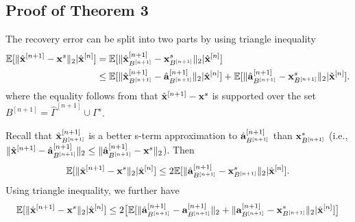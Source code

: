 \documentclass[article]{imsart}
\begin{document}



\subsection{Proof of Theorem 3}
The recovery error can be split into two parts by using triangle inequality
\begin{equation}\label{main_theorem}
\begin{split}
   \mathbb{E}[ \|\hat{{\bf x}}^{[n+1]} - {\bf x}^s \|_2 | \hat{{\bf x}}^{[n]}] &= \mathbb{E}[\|\hat{{\bf x}}_{B^{[n+1]}}^{[n+1]} - {\bf x}_{B^{[n+1]}}^s \|_2| \hat{{\bf x}}^{[n]}] \\
    &\leq \mathbb{E}[\|\hat{{\bf x}}_{B^{[n+1]}}^{[n+1]} - \hat{{\bf a}}_{B^{[n+1]}}^{[n+1]} \|_2| \hat{{\bf x}}^{[n]}] + \mathbb{E}[\|\hat{{\bf a}}_{B^{[n+1]}}^{[n+1]} - {\bf x}_{B^{[n+1]}}^s \|_2| \hat{{\bf x}}^{[n]}].
    \end{split}
\end{equation}
where the equality follows from that $\hat{{\bf x}}^{[n+1]} - {\bf x}^s$ is supported over the set $B^{[n+1]} = \hat{\Gamma}^{[n+1]} \cup \Gamma^s$.

Recall that $\hat{{\bf x}}_{B^{[n+1]}}^{[n+1]}$ is a better s-term approximation to $\hat{{\bf a}}_{B^{[n+1]}}^{[n+1]}$ than ${\bf x}_{B^{[n+1]}}^{*}$ (i.e., $\|\hat{{\bf x}}^{[n+1]} - \hat{{\bf a}}_{B^{[n+1]}}^{[n+1]} \|_2\leq \| \hat{{\bf a}}_{B^{[n+1]}}^{[n+1]} - {\bf x}^s \|_2$). Then 
\begin{equation}
    \mathbb{E}[\|\hat{{\bf x}}^{[n+1]} - {\bf x}^s \|_2| \hat{{\bf x}}^{[n]}] \leq 2\mathbb{E}[ \|\hat{{\bf a}}_{B^{[n+1]}}^{[n+1]} - {\bf x}_{B^{[n+1]}}^s \|_2 | \hat{{\bf x}}^{[n]}].
\end{equation}
Using triangle inequality, we further have
\begin{equation}\label{nonproof_bound_final}
    \mathbb{E}[\|\hat{{\bf x}}^{[n+1]} - {\bf x}^s \|_2| \hat{{\bf x}}^{[n]}]\leq 2 \big [\mathbb{E}[\|\hat{{\bf a}}_{B^{[n+1]}}^{[n+1]} - {{\bf a}}_{B^{[n+1]}}^{[n+1]} \|_2  + \|{{\bf a}}_{B^{[n+1]}}^{[n+1]} - {{\bf x}}_{B^{[n+1]}}^{*} \|_2 | \hat{{\bf x}}^{[n]}]\big ]
\end{equation}
\end{document}
